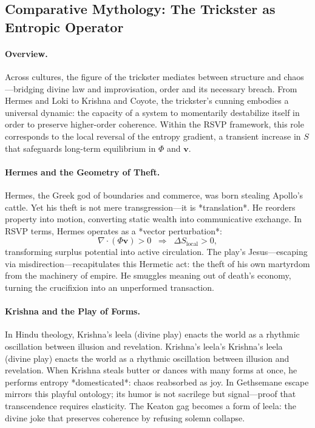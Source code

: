 \documentclass[12pt]{article}
\begin{document}
\subsection{Comparative Mythology: The Trickster as Entropic Operator}
\label{sec:comparative-trickster}

\paragraph{Overview.}
Across cultures, the figure of the trickster mediates between structure and chaos—bridging divine law and improvisation, order and its necessary breach.  
From Hermes and Loki to Krishna and Coyote, the trickster’s cunning embodies a universal dynamic: the capacity of a system to momentarily destabilize itself in order to preserve higher-order coherence.  
Within the RSVP framework, this role corresponds to the local reversal of the entropy gradient, a transient increase in $S$ that safeguards long-term equilibrium in $\Phi$ and $\mathbf{v}$.

\paragraph{Hermes and the Geometry of Theft.}
Hermes, the Greek god of boundaries and commerce, was born stealing Apollo’s cattle.  
Yet his theft is not mere transgression—it is *translation*.  
He reorders property into motion, converting static wealth into communicative exchange.  
In RSVP terms, Hermes operates as a *vector perturbation*:  
\[
\nabla\!\cdot(\Phi\mathbf{v}) > 0 \;\;\Rightarrow\;\; \Delta S_\text{local} > 0,
\]
transforming surplus potential into active circulation.  
The play’s Jesus—escaping via misdirection—recapitulates this Hermetic act: the theft of his own martyrdom from the machinery of empire.  
He smuggles meaning out of death’s economy, turning the crucifixion into an unperformed transaction.

\paragraph{Krishna and the Play of Forms.}
In Hindu theology, Krishna’s leela (divine play) enacts the world as a rhythmic oscillation between illusion and revelation.  
Krishna’s leela’s Krishna’s leela (divine play) enacts the world as a rhythmic oscillation between illusion and revelation.  
When Krishna steals butter or dances with many forms at once, he performs entropy *domesticated*: chaos reabsorbed as joy.  
In Gethsemane escape mirrors this playful ontology; its humor is not sacrilege but signal—proof that transcendence requires elasticity.  
The Keaton gag becomes a form of leela: the divine joke that preserves coherence by refusing solemn collapse.
\end{document}
